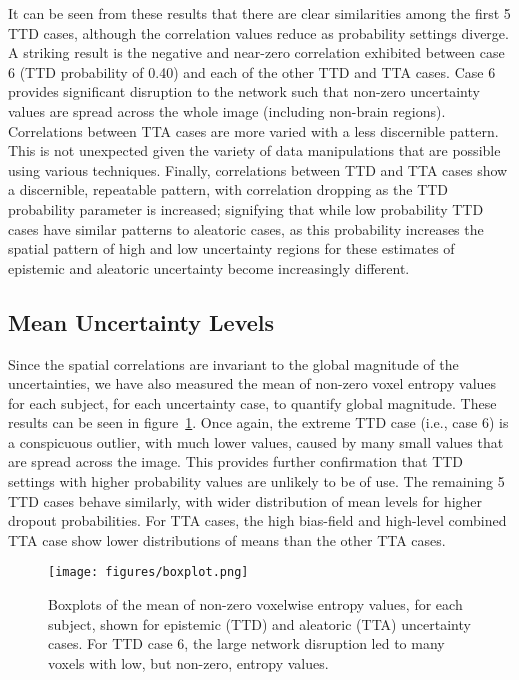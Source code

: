 \documentclass[runningheads]{llncs}
\begin{document}
It can be seen from these results that there are clear similarities among the first 5 TTD cases, although the correlation values reduce as probability settings diverge. A striking result is the negative and near-zero correlation exhibited between case 6 (TTD probability of 0.40) and each of the other TTD and TTA cases. Case 6 provides significant disruption to the network such that non-zero uncertainty values are spread across the whole image (including non-brain regions). Correlations between TTA cases are more varied with a less discernible pattern. This is not unexpected given the variety of data manipulations that are possible using various techniques. Finally, correlations between TTD and TTA cases show a discernible, repeatable pattern, with correlation dropping as the TTD probability parameter is increased; signifying that while low probability TTD cases have similar patterns to aleatoric cases, as this probability increases the spatial pattern of high and low uncertainty regions for these estimates of epistemic and aleatoric uncertainty become increasingly different. 

\subsection{Mean Uncertainty Levels}

Since the spatial correlations are invariant to the global magnitude of the uncertainties, we have also measured the mean of non-zero voxel entropy values for each subject, for each uncertainty case, to quantify global magnitude. These results can be seen in figure~\ref{fig3}. Once again, the extreme TTD case (i.e., case 6) is a conspicuous outlier, with much lower values, caused by many small values that are spread across the image. This provides further confirmation that TTD settings with higher probability values are unlikely to be of use. The remaining 5 TTD cases behave similarly, with wider distribution of mean levels for higher dropout probabilities. For TTA cases, the high bias-field and high-level combined TTA case show lower distributions of means than the other TTA cases. 

\begin{figure}[t]
\centerline{\texttt{[image: figures/boxplot.png]}}
\caption{Boxplots of the mean of non-zero voxelwise entropy values, for each subject, shown for epistemic (TTD) and aleatoric (TTA) uncertainty cases. For TTD case 6, the large network disruption led to many voxels with low, but non-zero, entropy values.} \label{fig3}
\end{figure}
\end{document}
